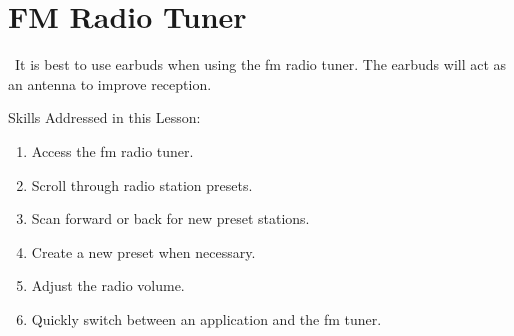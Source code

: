 \documentclass[10pt,letterpaper,twoside]{report}
\begin{document}
{{{%
\clearpage

\section{ FM Radio Tuner}
\
It is best to use earbuds when using the fm radio tuner. The earbuds will act as an antenna to improve reception.

Skills Addressed in this Lesson:
\begin{enumerate}
	\item Access the fm radio tuner.
	\item Scroll through radio station presets.
	\item Scan forward or back for new preset stations.
	\item Create a new preset when necessary.
	\item Adjust the radio volume.
	\item Quickly switch between an application and the fm tuner.
\end{enumerate}

}}}
\end{document}
